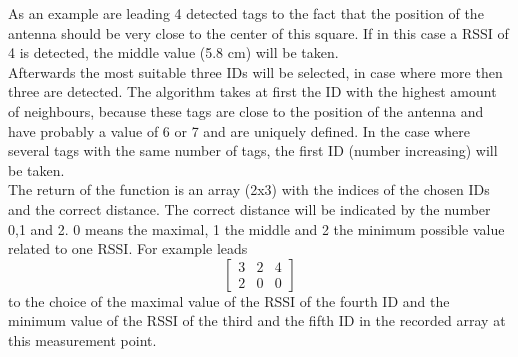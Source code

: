 As an example are leading 4 detected tags to the fact that the position of the antenna should be very close to the center of this square. If in this case a RSSI of 4 is detected, the middle value (5.8 cm) will be taken. \\
Afterwards the most suitable three IDs will be selected, in case where more then three are detected. The algorithm takes at first the ID with the highest amount of neighbours, because these tags are close to the position of the antenna and have probably a value of 6 or 7 and are uniquely defined. In the case where several tags with the same number of tags, the first ID (number increasing) will be taken. \\
The return of the function is an array (2x3) with the indices of the chosen IDs and the correct distance. The correct distance will be indicated by the number 0,1 and 2. 0 means the maximal, 1 the middle and 2 the minimum possible value related to one RSSI. For example leads 
\[
\begin{bmatrix}
    3 & 2 & 4\\
    2 & 0 & 0 
\end{bmatrix} 
\]
to the choice of the maximal value of the RSSI of the fourth ID and the minimum value of the RSSI of the third and the fifth ID in the recorded array at this measurement point. \\

